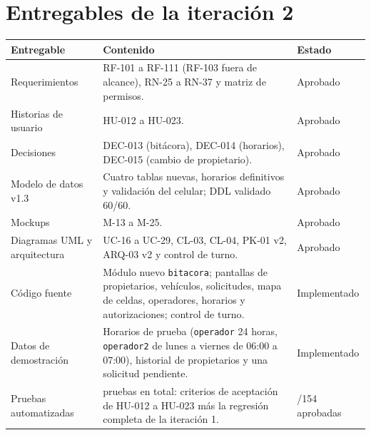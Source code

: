 \section{Entregables de la iteración 2}
\begin{longtable}{>{\raggedright\arraybackslash}p{5.2cm}>{\raggedright\arraybackslash}p{6.6cm}>{\raggedright\arraybackslash}p{2.6cm}}
\toprule
\textbf{Entregable} & \textbf{Contenido} & \textbf{Estado}\\
\midrule\endhead
Requerimientos & RF-101 a RF-111 (RF-103 fuera de alcance), RN-25 a RN-37 y matriz de permisos. & Aprobado\\
Historias de usuario & HU-012 a HU-023. & Aprobado\\
Decisiones & DEC-013 (bitácora), DEC-014 (horarios), DEC-015 (cambio de propietario). & Aprobado\\
Modelo de datos v1.3 & Cuatro tablas nuevas, horarios definitivos y validación del celular; DDL validado 60/60. & Aprobado\\
Mockups & M-13 a M-25. & Aprobado\\
Diagramas UML y arquitectura & UC-16 a UC-29, CL-03, CL-04, PK-01 v2, ARQ-03 v2 y control de turno. & Aprobado\\
Código fuente & Módulo nuevo \texttt{bitacora}; pantallas de propietarios, vehículos, solicitudes, mapa de celdas, operadores, horarios y autorizaciones; control de turno. & Implementado\\
Datos de demostración & Horarios de prueba (\texttt{operador} 24 horas, \texttt{operador2} de lunes a viernes de 06:00 a 07:00), historial de propietarios y una solicitud pendiente. & Implementado\\
Pruebas automatizadas & 154 pruebas en total: criterios de aceptación de HU-012 a HU-023 más la regresión completa de la iteración 1. & 154/154 aprobadas\\
\bottomrule
\end{longtable}

